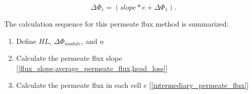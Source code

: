 \begin{equation} \label{intermediary_permeate_flux}
    \Delta \Phi_{e} = (slope*e+\Delta \Phi_{1}).
\end{equation}

The calculation sequence for this permeate flux method is summarized:
\begin{enumerate}
    \item Define $HL$, $\Delta \Phi_{module}$, and $n$
    \item Calculate the permeate flux slope [\cref{flux_slope,average_permeate_flux,head_loss}]
    \item Calculate the permeate flux in each cell $e$ [\cref{intermediary_permeate_flux}]
\end{enumerate}


